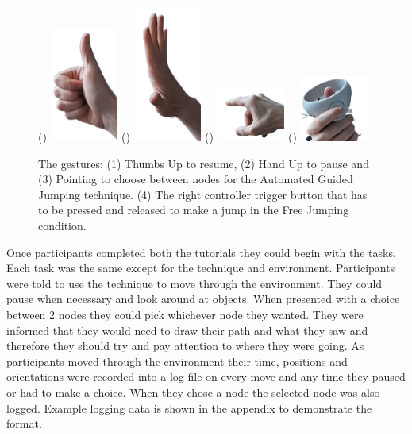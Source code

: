 \begin{figure}[]
	()
	\includegraphics[width=0.2\textwidth]{images/thumbs-up.pdf}
	()
	\includegraphics[width=0.2\textwidth]{images/hand-up.pdf}
	()
	\includegraphics[width=0.2\textwidth]{images/pointing.pdf}
	()
	\includegraphics[width=0.2\textwidth]{images/controller.pdf}
	\caption{The gestures: (1) Thumbs Up to resume, (2) Hand Up to pause and (3) Pointing to choose between nodes for the Automated Guided Jumping technique. (4) The right controller trigger button that has to be pressed and released to make a jump in the Free Jumping condition.}
	\label{fig:gestures-controller}
\end{figure}

Once participants completed both the tutorials they could begin with the tasks. Each task was the same except for the technique and environment. Participants were told to use the technique to move through the environment. They could pause when necessary and look around at objects. When presented with a choice between 2 nodes they could pick whichever node they wanted. They were informed that they would need to draw their path and what they saw and therefore they should try and pay attention to where they were going. As participants moved through the environment their time, positions and orientations were recorded into a log file on every move and any time they paused or had to make a choice. When they chose a node the selected node was also logged. Example logging data is shown in the appendix to demonstrate the format.

